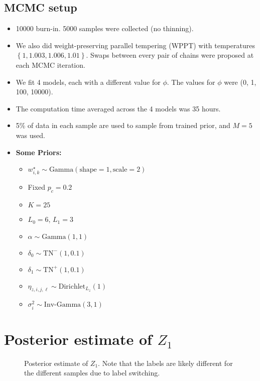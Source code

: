 \documentclass[11pt]{article} %
\newcommand{\bc}[1]{ \left\{#1\right\} }
\newcommand{\Gam}{ \text{Gamma} }
\newcommand{\InvGamma}{ \text{Inv-Gamma} }
\def\Dir{\text{Dirichlet}}
\def\TN{\text{TN}}
\def\imscale{.5}
\begin{document}
\subsection{MCMC setup}
\begin{itemize}
  \item 10000 burn-in. 5000 samples were collected (no thinning).
  \item We also did weight-preserving parallel tempering (WPPT) with temperatures 
        $\bc{1, 1.003, 1.006, 1.01}$. Swaps between every pair of chains were
        proposed at each MCMC iteration.
  \item We fit 4 models, each with a different value for $\phi$. The values
        for $\phi$ were (0, 1, 100, 10000).
  \item The computation time averaged across the 4 models was 35 hours.
  \item 5\% of data in each sample are used to sample from trained prior, and
    $M=5$ was used.
  \item \textbf{Some Priors:}
  \begin{itemize}
    \item $w^\star_{i,k} \sim \Gam(\text{shape}=1, \text{scale}=2)$
    \item Fixed $p_c=0.2$ 
    \item $K=25$
    \item $L_0=6$, $L_1=3$
    \item $\alpha \sim \Gam(1, 1)$
    \item $\delta_0 \sim \TN^-(1, 0.1)$
    \item $\delta_1 \sim \TN^+(1, 0.1)$
    \item $\eta_{z, i,j,\ell} \sim \Dir_{L_z}(1)$
    \item $\sigma^2_i \sim \InvGamma(3, 1)$
  \end{itemize}
\end{itemize}


\newpage
\section{Posterior estimate of $Z_1$}
\begin{figure}[H]
  \begin{center}  %
    \imgtemplate{Z1.pdf}{\imscale}
  \end{center}
  \caption{Posterior estimate of $Z_1$.
  Note that the labels are likely different for the different samples due
  to label switching.}
  \label{fig:z1est}
\end{figure}
\end{document}
